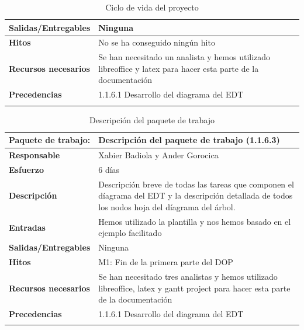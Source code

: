 \documentclass{report}
\begin{document}
\begin{center}
\begin{longtable}{|p{6cm}|p{6cm}|}
                    \hline
                    \textbf{Salidas/Entregables} & Ninguna\\
                    \hline
                    \textbf{Hitos} & No se ha conseguido ningún hito\\
                    \hline
                    \textbf{Recursos necesarios} & Se han necesitado un analista y hemos utilizado libreoffice y latex para hacer esta parte de la documentación\\
                    \hline
                    \textbf{Precedencias} & 1.1.6.1 Desarrollo del diagrama del EDT\\
                    \hline
                    \caption{Ciclo de vida del proyecto}
                \end{longtable}
                \begin{longtable}{|p{6cm}|p{6cm}|}
                    \hline
                    \textbf{Paquete de trabajo:} & Descripción del paquete de trabajo (1.1.6.3)\\
                    \hline
                    \textbf{Responsable} & Xabier Badiola y Ander Gorocica\\
                    \hline
                    \textbf{Esfuerzo} & 6 días\\
                    \hline
                    \textbf{Descripción} & Descripción breve de todas las tareas que componen el díagrama del EDT y la descripción detallada de todos los nodos hoja del díagrama del árbol.\\
                    \hline
                    \textbf{Entradas} & Hemos utilizado la plantilla y nos hemos basado en el ejemplo facilitado\\
                    \hline
                    \textbf{Salidas/Entregables} & Ninguna\\
                    \hline
                    \textbf{Hitos} & M1: Fin de la primera parte del DOP\\
                    \hline
                    \textbf{Recursos necesarios} & Se han necesitado tres analistas y hemos utilizado libreoffice, latex y gantt project para hacer esta parte de la documentación\\
                    \hline
                    \textbf{Precedencias} & 1.1.6.1 Desarrollo del diagrama del EDT\\
                    \hline
                    \caption{Descripción del paquete de trabajo}
                \end{longtable}
                \clearpage

\end{center}
\end{document}
